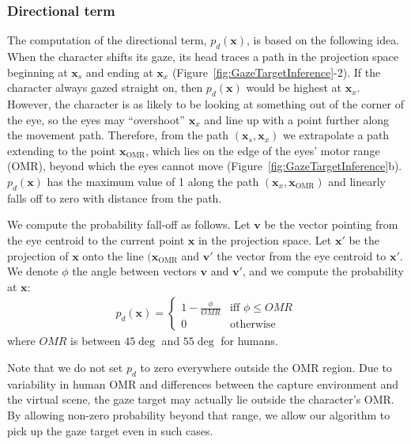 \subsubsection{Directional term}

The computation of the directional term, $p_d(\mathbf{x})$, is based on the following idea. When the character shifts its gaze, its head traces a path in the projection space beginning at $\mathbf{x}_s$ and ending at $\mathbf{x}_x$ (Figure~\ref{fig:GazeTargetInference}-2). If the character always gazed straight on, then $p_d(\mathbf{x})$ would be highest at $\mathbf{x}_x$. However, the character is as likely to be looking at something out of the corner of the eye, so the eyes may ``overshoot'' $\mathbf{x}_x$ and line up with a point further along the movement path. Therefore, from the path $(\mathbf{x}_s, \mathbf{x}_x)$ we extrapolate a path extending to the point $\mathbf{x}_{\mathrm{OMR}}$, which lies on the edge of the eyes' motor range (OMR), beyond which the eyes cannot move (Figure~\ref{fig:GazeTargetInference}b). $p_d(\mathbf{x})$ has the maximum value of 1 along the path $(\mathbf{x}_x, \mathbf{x}_{\mathrm{OMR}})$ and linearly falls off to zero with distance from the path.

We compute the probability fall-off as follows. Let $\mathbf{v}$ be the vector pointing from the eye centroid to the current point $\mathbf{x}$ in the projection space. Let $\mathbf{x}'$ be the projection of $\mathbf{x}$ onto the line $(\mathbf{x}_{\mathrm{OMR}}$ and $\mathbf{v}'$ the vector from the eye centroid to $\mathbf{x}'$. We denote $\phi$ the angle between vectors $\mathbf{v}$ and $\mathbf{v}'$, and we compute the probability at $\mathbf{x}$:
%
\begin{align} \label{eq:GazeDirectionProbability}
p_d(\mathbf{x}) =
\begin{cases}
1 - \frac{\phi}{OMR} & \text{iff } \phi \leq OMR \\
0 & \text{otherwise}
\end{cases}
\end{align}
%
where $OMR$ is between $45\deg$ and $55\deg$ for humans.

Note that we do not set $p_d$ to zero everywhere outside the OMR region. Due to variability in human OMR and differences between the capture environment and the virtual scene, the gaze target may actually lie outside the character's OMR. By allowing non-zero probability beyond that range, we allow our algorithm to pick up the gaze target even in such cases.

